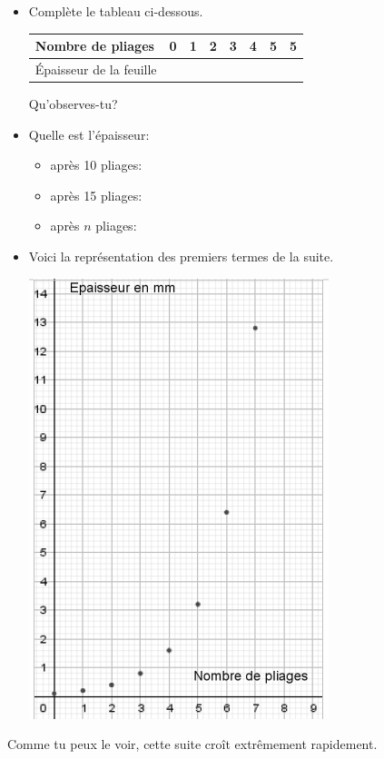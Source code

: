 \documentclass[a4paper,12pt]{report}
\begin{document}
\begin{itemize}
\item Complète le tableau ci-dessous.

\begin{center}
\begin{tabular}{|l|p{1cm}|p{1cm}|p{1cm}|p{1cm}|p{1cm}|p{1cm}|p{1cm}|}
\hline
Nombre de pliages & 0 & 1 & 2 & 3 & 4 & 5 & 5\\[0pt]
\hline
Épaisseur de la feuille &  &  &  &  &  &  & \\[0pt]
\hline
\end{tabular}
\end{center}

Qu'observes-tu?\dotfill

\dotfill

\item Quelle est l'épaisseur:
\begin{itemize}
\item après 10 pliages:\dotfill
\item après 15 pliages: \dotfill

\item après \(n\) pliages:\dotfill
\end{itemize}

\begin{center}

\end{center}
\item Voici la représentation des premiers termes de la suite.

\begin{center}
\includegraphics[width=0.5\linewidth]{figures/fig8.png}
\end{center}
\end{itemize}
Comme tu peux le voir, cette suite croît extrêmement rapidement.
\end{document}
